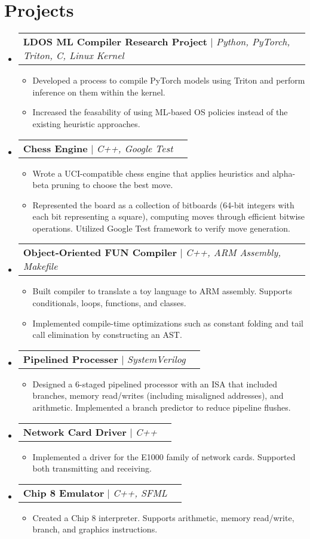 \documentclass[letterpaper,11pt]{article}
\makeatletter
\newcommand{\resumeItem}[1]{
  \item\small{
    {#1 \vspace{-2pt}}
  }
}
\newcommand{\resumeProjectHeading}[2]{
    \item
    \begin{tabular*}{0.97\textwidth}{l@{\extracolsep{\fill}}r}
      \small#1 & #2 \\
    \end{tabular*}\vspace{-7pt}
}
\newcommand{\resumeSubHeadingListStart}{\begin{itemize}[leftmargin=0.15in, label={}]}
\newcommand{\resumeSubHeadingListEnd}{\end{itemize}}
\newcommand{\resumeItemListStart}{\begin{itemize}}
\newcommand{\resumeItemListEnd}{\end{itemize}\vspace{-5pt}}
\makeatother
\begin{document}
\section{Projects}
    \resumeSubHeadingListStart
      \resumeProjectHeading
          {\textbf{LDOS ML Compiler Research Project} $|$ \emph{Python, PyTorch, Triton, C, Linux Kernel}}{}
          \resumeItemListStart
          \resumeItem{Developed a process to compile PyTorch models using Triton and perform inference on them within the kernel.}
          \resumeItem{Increased the feasability of using ML-based OS policies instead of the existing heuristic approaches.}
          \resumeItemListEnd
      \resumeProjectHeading
          {\textbf{Chess Engine} $|$ \emph{C++, Google Test}}{}
          \resumeItemListStart
            \resumeItem{Wrote a UCI-compatible chess engine that applies heuristics and alpha-beta pruning to choose the best move.}
            \resumeItem{Represented the board as a collection of bitboards (64-bit integers with each bit representing a square), computing moves through efficient bitwise operations. Utilized Google Test framework to verify move generation.}
          \resumeItemListEnd
      \resumeProjectHeading
          {\textbf{Object-Oriented FUN Compiler} $|$ \emph{C++, ARM Assembly, Makefile}}{}
          \resumeItemListStart
            \resumeItem{Built compiler to translate a toy language to ARM assembly. Supports conditionals, loops, functions, and classes.}
            \resumeItem{Implemented compile-time optimizations such as constant folding and tail call elimination by constructing an AST.}
          \resumeItemListEnd
    \resumeProjectHeading
          {\textbf{Pipelined Processer} $|$ \emph{SystemVerilog}}{}
          \resumeItemListStart
            \resumeItem{Designed a 6-staged pipelined processor with an ISA that included branches, memory read/writes (including misaligned addresses), and arithmetic. Implemented a branch predictor to reduce pipeline flushes.}
          \resumeItemListEnd
      \resumeProjectHeading
          {\textbf{Network Card Driver} $|$ \emph{C++}}{}
          \resumeItemListStart
            \resumeItem{Implemented a driver for the E1000 family of network cards. Supported both transmitting and receiving.}
          \resumeItemListEnd
      \resumeProjectHeading
          {\textbf{Chip 8 Emulator} $|$ \emph{C++, SFML}}{}
          \resumeItemListStart
            \resumeItem{Created a Chip 8 interpreter. Supports arithmetic, memory read/write, branch, and graphics instructions.}
          \resumeItemListEnd

    \resumeSubHeadingListEnd

\end{document}
